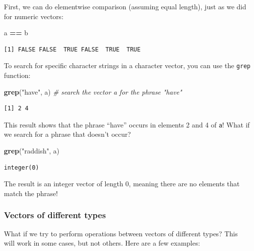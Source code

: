 \documentclass[
]{book}
\newenvironment{Shaded}{\begin{snugshade}}{\end{snugshade}}
\newcommand{\CommentTok}[1]{\textcolor[rgb]{0.56,0.35,0.01}{\textit{#1}}}
\newcommand{\KeywordTok}[1]{\textcolor[rgb]{0.13,0.29,0.53}{\textbf{#1}}}
\newcommand{\NormalTok}[1]{#1}
\newcommand{\OperatorTok}[1]{\textcolor[rgb]{0.81,0.36,0.00}{\textbf{#1}}}
\newcommand{\StringTok}[1]{\textcolor[rgb]{0.31,0.60,0.02}{#1}}
\begin{document}
First, we can do elementwise comparison (assuming equal length), just as we did for numeric vectors:

\begin{Shaded}
\begin{Highlighting}[]
\NormalTok{a }\OperatorTok{==}\StringTok{ }\NormalTok{b}
\end{Highlighting}
\end{Shaded}

\begin{verbatim}
[1] FALSE FALSE  TRUE FALSE  TRUE  TRUE
\end{verbatim}

To search for specific character strings in a character vector, you can use the \texttt{grep} function:

\begin{Shaded}
\begin{Highlighting}[]
\KeywordTok{grep}\NormalTok{(}\StringTok{"have"}\NormalTok{, a)   }\CommentTok{# search the vector a for the phrase "have"}
\end{Highlighting}
\end{Shaded}

\begin{verbatim}
[1] 2 4
\end{verbatim}

This result shows that the phrase ``have'' occurs in elements 2 and 4 of \texttt{a}!
What if we search for a phrase that doesn't occur?

\begin{Shaded}
\begin{Highlighting}[]
\KeywordTok{grep}\NormalTok{(}\StringTok{"raddish"}\NormalTok{, a)}
\end{Highlighting}
\end{Shaded}

\begin{verbatim}
integer(0)
\end{verbatim}

The result is an integer vector of length 0, meaning there are no elements that match the phrase!

\hypertarget{vectors-of-different-types}{%
\subsubsection{Vectors of different types}\label{vectors-of-different-types}}

What if we try to perform operations between vectors of different types?
This will work in some cases, but not others. Here are a few examples:
\end{document}
